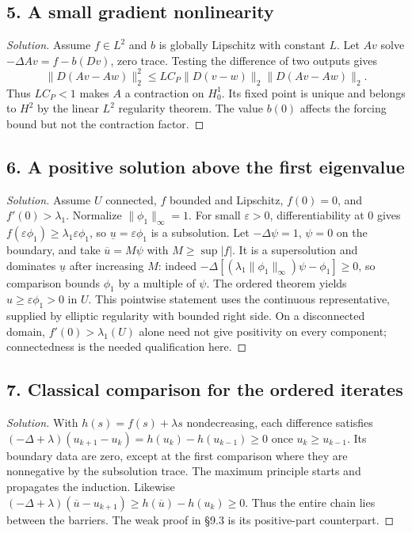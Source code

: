 \subsection*{5. A small gradient nonlinearity}
\begin{proof}[Solution]
Assume $f\in L^2$ and $b$ is globally Lipschitz with constant $L$.
Let $Av$ solve $-\Delta Av=f-b(Dv)$, zero trace. Testing the difference
of two outputs gives
\[
 \|D(Av-Aw)\|_2^2\leq LC_P\|D(v-w)\|_2\|D(Av-Aw)\|_2.
\]
Thus $LC_P<1$ makes $A$ a contraction on $H^1_0$. Its fixed point
is unique and belongs to $H^2$ by the linear $L^2$ regularity theorem.
The value $b(0)$ affects the forcing bound but not the contraction factor.
\end{proof}

\subsection*{6. A positive solution above the first eigenvalue}
\begin{proof}[Solution]
Assume $U$ connected, $f$ bounded and Lipschitz, $f(0)=0$, and
$f'(0)>\lambda_1$. Normalize $\|\phi_1\|_\infty=1$.
For small $\varepsilon>0$, differentiability at $0$ gives
$f(\varepsilon\phi_1)\geq\lambda_1\varepsilon\phi_1$,
so $\underline u=\varepsilon\phi_1$ is a subsolution.
Let $-\Delta\psi=1$, $\psi=0$ on the boundary, and take
$\overline u=M\psi$ with $M\geq\sup|f|$.
It is a supersolution and dominates $\underline u$ after increasing $M$:
indeed $-\Delta[(\lambda_1\|\phi_1\|_\infty)\psi-\phi_1]\geq0$,
so comparison bounds $\phi_1$ by a multiple of $\psi$.
The ordered theorem yields $u\geq\varepsilon\phi_1>0$ in $U$.
This pointwise statement uses the continuous representative, supplied by
elliptic regularity with bounded right side. On a disconnected domain,
$f'(0)>\lambda_1(U)$ alone need not give positivity on every component;
connectedness is the needed qualification here.
\end{proof}

\subsection*{7. Classical comparison for the ordered iterates}
\begin{proof}[Solution]
With $h(s)=f(s)+\lambda s$ nondecreasing, each difference satisfies
$(-\Delta+\lambda)(u_{k+1}-u_k)=h(u_k)-h(u_{k-1})\geq0$
once $u_k\geq u_{k-1}$. Its boundary data are zero, except at the
first comparison where they are nonnegative by the subsolution trace.
The maximum principle starts and propagates the induction.
Likewise $(-\Delta+\lambda)(\overline u-u_{k+1})\geq
h(\overline u)-h(u_k)\geq0$. Thus the entire chain lies between the
barriers. The weak proof in \S9.3 is its positive-part counterpart.
\end{proof}

